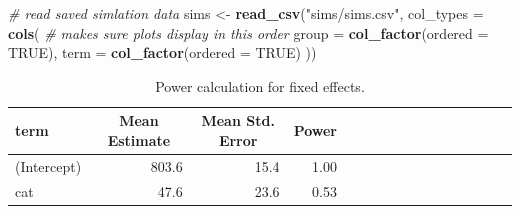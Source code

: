 \documentclass[doc,floatsintext]{apa6}
\newenvironment{Shaded}{\begin{snugshade}}{\end{snugshade}}
\newcommand{\CommentTok}[1]{\textcolor[rgb]{0.56,0.35,0.01}{\textit{#1}}}
\newcommand{\DataTypeTok}[1]{\textcolor[rgb]{0.13,0.29,0.53}{#1}}
\newcommand{\FloatTok}[1]{\textcolor[rgb]{0.00,0.00,0.81}{#1}}
\newcommand{\KeywordTok}[1]{\textcolor[rgb]{0.13,0.29,0.53}{\textbf{#1}}}
\newcommand{\NormalTok}[1]{#1}
\newcommand{\OperatorTok}[1]{\textcolor[rgb]{0.81,0.36,0.00}{\textbf{#1}}}
\newcommand{\OtherTok}[1]{\textcolor[rgb]{0.56,0.35,0.01}{#1}}
\newcommand{\StringTok}[1]{\textcolor[rgb]{0.31,0.60,0.02}{#1}}
\begin{document}
\begin{Shaded}
\begin{Highlighting}[]
\CommentTok{# read saved simlation data}
\NormalTok{sims <-}\StringTok{ }\KeywordTok{read_csv}\NormalTok{(}\StringTok{"sims/sims.csv"}\NormalTok{, }\DataTypeTok{col_types =} \KeywordTok{cols}\NormalTok{(}
  \CommentTok{# makes sure plots display in this order}
  \DataTypeTok{group =} \KeywordTok{col_factor}\NormalTok{(}\DataTypeTok{ordered =} \OtherTok{TRUE}\NormalTok{),}
  \DataTypeTok{term =} \KeywordTok{col_factor}\NormalTok{(}\DataTypeTok{ordered =} \OtherTok{TRUE}\NormalTok{)}
\NormalTok{))}
\end{Highlighting}
\end{Shaded}

\begin{Shaded}
\end{Shaded}

\begin{table}[H]
\begin{center}
\begin{threeparttable}
\caption{\label{tab:calc-power-table}Power calculation for fixed effects.}
\begin{tabular}{lrrrlrrrlrrrlrrr}
\toprule
term & \multicolumn{1}{c}{Mean Estimate} & \multicolumn{1}{c}{Mean Std. Error} & \multicolumn{1}{c}{Power}\\
\midrule
(Intercept) & 803.6 & 15.4 & 1.00\\
cat & 47.6 & 23.6 & 0.53\\
\bottomrule
\end{tabular}
\end{threeparttable}
\end{center}
\end{table}
\end{document}
